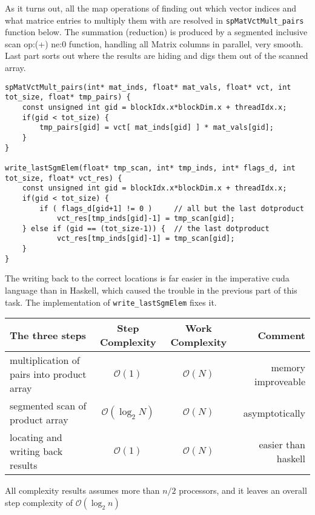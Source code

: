 \documentclass[a4paper,10pt]{article}
\begin{document}
As it turns out, all the map operations of finding out which vector indices and what matrice entries to multiply them with are resolved in \texttt{spMatVctMult\_pairs} function below.
The summation (reduction) is produced by a segmented inclusive scan op:(+) ne:$0$ function, handling all Matrix columns in parallel, very smooth. Last part sorts out where the results are hiding and digs them out of the scanned array.
\begin{verbatim}
spMatVctMult_pairs(int* mat_inds, float* mat_vals, float* vct, int tot_size, float* tmp_pairs) {
    const unsigned int gid = blockIdx.x*blockDim.x + threadIdx.x;
    if(gid < tot_size) {
        tmp_pairs[gid] = vct[ mat_inds[gid] ] * mat_vals[gid];
    }
}

write_lastSgmElem(float* tmp_scan, int* tmp_inds, int* flags_d, int tot_size, float* vct_res) {
    const unsigned int gid = blockIdx.x*blockDim.x + threadIdx.x;
    if(gid < tot_size) {
        if ( flags_d[gid+1] != 0 )     // all but the last dotproduct
            vct_res[tmp_inds[gid]-1] = tmp_scan[gid];
    } else if (gid == (tot_size-1)) {  // the last dotproduct
            vct_res[tmp_inds[gid]-1] = tmp_scan[gid];
    }
}
\end{verbatim}
The writing back to the correct locations is far easier in the imperative cuda language than in Haskell, which caused the trouble in the previous part of this task. The implementation of \texttt{write\_lastSgmElem} fixes it.

\begin{tabular}{l|cc|r}
The three steps & Step Complexity & Work Complexity & Comment\\ \hline
multiplication of pairs into product array & $\mathcal{O}(1)$ & $\mathcal{O}(N)$ & memory improveable \\
segmented scan of product array & $\mathcal{O}(\log_2 N)$ & $\mathcal{O}(N)$ & asymptotically\\
locating and writing back results & $\mathcal{O}(1)$ & $\mathcal{O}(N)$ & easier than haskell \\ \hline
\end{tabular}

All complexity results assumes more than $n/2$ processors, and it leaves an overall step complexity of $\mathcal{O}(\log_2 n)$
\end{document}
